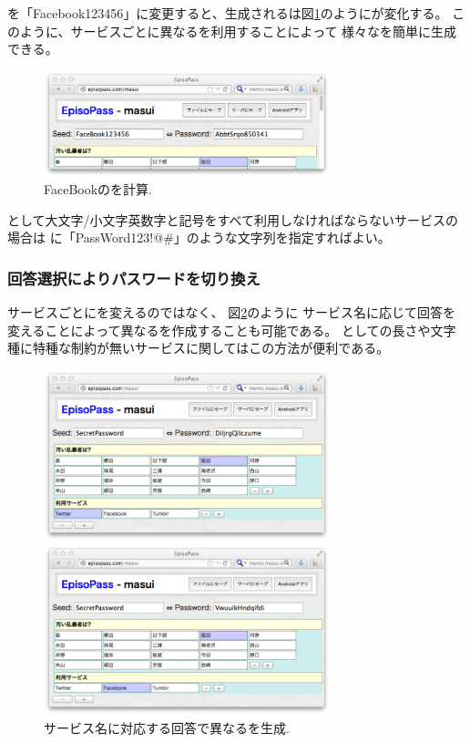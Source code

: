 \documentclass[twoside]{wiss}
\begin{document}
{\SS}を「\textsf{Facebook123456}」に変更すると、生成される{\PW}は図\ref{web2}のようにが変化する。
このように、サービスごとに異なる{\SS}を利用することによって
様々な{\PW}を簡単に生成できる。

\begin{figure}[H]
\centerline{\includegraphics[width=83mm,bb=0 0 718 265]{figures/36c371a13a8250c60fb9c03174382443.png}}
\caption{FaceBookの{\PW}を計算.}
\label{web2}
\end{figure}

{\PW}として大文字/小文字英数字と記号をすべて利用しなければならないサービスの場合は
{\SS}に「\textsf{PassWord123!@\#}」のような文字列を指定すればよい。

\subsubsection{回答選択によりパスワードを切り換え}

サービスごとに{\SS}を変えるのではなく、
図\ref{web3}のように
サービス名に応じて回答を変えることによって異なる{\PW}を作成することも可能である。
{\PW}としての長さや文字種に特種な制約が無いサービスに関してはこの方法が便利である。

\begin{figure}[H]
\centerline{\includegraphics[width=83mm,bb=0 0 718 428]{figures/a9167a6ec6af9c70dd1617e3fc25ec30.png}}
\centerline{\includegraphics[width=83mm,bb=0 0 718 428]{figures/5b887fabeb8e3319623901fe4a6c56f2.png}}
\caption{サービス名に対応する回答で異なる{\PW}を生成.}
\label{web3}
\end{figure}
\end{document}
